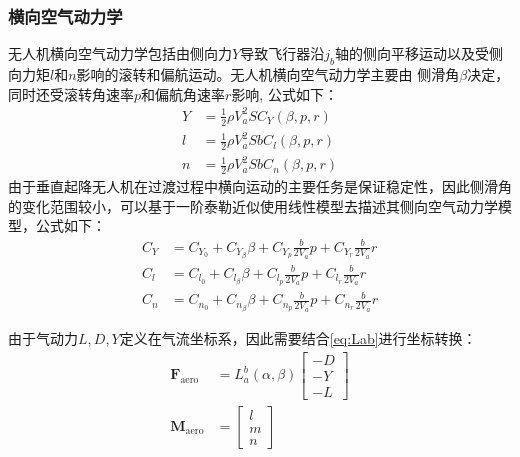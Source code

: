 \subsubsection{横向空气动力学}
无人机横向空气动力学包括由侧向力$Y$导致飞行器沿$j_{b}$轴的侧向平移运动以及受侧向力矩$l$和$n$影响的滚转和偏航运动。无人机横向空气动力学主要由
侧滑角$\beta$决定，同时还受滚转角速率$p$和偏航角速率$r$影响, 公式如下：
\begin{align}
    Y & = \frac{1}{2} \rho V_{a}^{2} S C_{Y}\left(\beta, p, r\right) \\
    l & = \frac{1}{2} \rho V_{a}^{2} S b C_{l}\left(\beta, p, r\right) \\
    n & = \frac{1}{2} \rho V_{a}^{2} S b C_{n}\left(\beta, p, r\right)
\end{align}
由于垂直起降无人机在过渡过程中横向运动的主要任务是保证稳定性，因此侧滑角的变化范围较小，可以基于一阶泰勒近似使用线性模型去描述其侧向空气动力学模型，公式如下：
\begin{align}
    C_{Y} & = C_{Y_{0}}+C_{Y_{\beta}} \beta+C_{Y_{p}} \frac{b}{2 V_{a}} p+C_{Y_{r}} \frac{b}{2 V_{a}}r\\
    C_{l} & = C_{l_{0}}+C_{l_{\beta}} \beta+C_{l_{p}} \frac{b}{2 V_{a}} p+C_{l_{r}} \frac{b}{2 V_{a}} r\\
    C_{n} & = C_{n_{0}}+C_{n_{\beta}} \beta+C_{n_{p}} \frac{b}{2 V_{a}} p+C_{n_{r}} \frac{b}{2 V_{a}} r
\end{align}

由于气动力$L,D,Y$定义在气流坐标系，因此需要结合\autoref{eq:Lab}进行坐标转换：
\begin{align}
    \mathbf{F}_{\text {aero}} & = L_{a}^{b}(\alpha ,\beta)\begin{bmatrix}
 -D\\
 -Y\\
-L
\end{bmatrix}\\
\mathbf{M}_{\text {aero}} & = \begin{bmatrix}
 l\\
 m\\
n
\end{bmatrix}
 \end{align}
